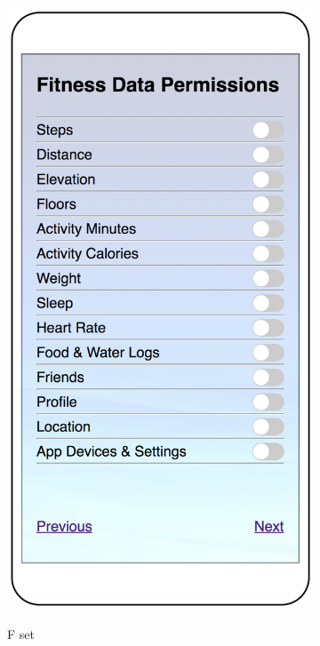 \begin{figure}
\begin{subfigure}[b]{0.24\textheight}
		\includegraphics[width=0.24\textheight]{figures/manual2.png}
		\label{fig:manualb}
		\caption{F set}
	\end{subfigure}
	\begin{subfigure}[b]{0.24\textheight}

\end{subfigure}
\end{figure}
